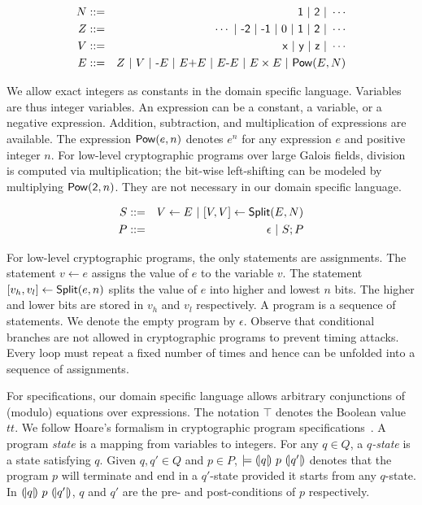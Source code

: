 \begin{eqnarray*}
  N & ::= & \dslcode{1}\ |\ \dslcode{2}\ |\ \cdots\\
  Z & ::= & \cdots \ |\ \dslcode{-2}\ |\ \dslcode{-1} \ |\ 0\ |\ 
            \dslcode{1}\ |\ \dslcode{2}\ |\ \cdots\\
  V & ::= & \dslcode{x} \ |\ \dslcode{y} \ |\ \dslcode{z} \ |\ \cdots\\
  E & ::= &  Z \ |\ V \ |\  \dslcode{-}E \ |\ E \dslcode{+} E 
             \ |\ E \dslcode{-} E
             \ |\ E \times E \ |\ \dslcode{Pow} (E, N)
\end{eqnarray*}

We allow exact integers as constants in the domain specific
language. Variables are thus integer variables. An expression can be a
constant, a variable, or a negative expression. Addition, subtraction,
and multiplication of expressions are available. The expression
$\mbox{\textsf{Pow}}(e, n)$ denotes $e^n$ for any expression $e$ and positive
integer $n$. For low-level cryptographic programs over large Galois
fields, division is computed via multiplication; the bit-wise
left-shifting can be modeled by multiplying
$\mbox{\textsf{Pow}}(\mbox{\textsf{2}}, n)$. They are not necessary in our
domain specific language. 

\begin{eqnarray*}
  S & ::= & V \leftarrow E 
            \ |\  {[}{V}, {V}{]} \leftarrow \mbox{\textsf{Split}} (E, N)\\
  P & ::= & \epsilon \ |\ S; P
\end{eqnarray*}

For low-level cryptographic programs, the only statements are
assignments. The statement $v \leftarrow e$ assigns the value of $e$
to the variable $v$. The statement ${[}{v_h}, {v_l}{]} \leftarrow
\mbox{\textsf{Split}}(e, n)$ splits the value of $e$ into higher and lowest
$n$ bits. The higher and lower bits are stored in $v_h$ and $v_l$
respectively. A program is a sequence of statements. We denote the
empty program by $\epsilon$. Observe that conditional branches are not
allowed in cryptographic programs to prevent timing attacks. Every
loop must repeat a fixed number of times and hence can be unfolded
into a sequence of assignments.

For specifications, our domain specific language allows arbitrary
conjunctions of (modulo) equations over expressions. The notation
$\top$ denotes the Boolean value $\mathit{tt}$. We follow Hoare's
formalism in cryptographic program specifications~\cite{H:69:ABCP}. A program
\textit{state} is a mapping from variables to integers. For any $q \in
Q$, a \emph{$q$-state} is a state satisfying $q$.
Given $q, q' \in Q$ and $p \in P$, $\models {(\!|}{q}{|\!)}~{p}~{(\!|}{q'}{|\!)}$
denotes that the program $p$ will terminate and end in a $q'$-state
provided it starts from any $q$-state. In ${(\!|}{q}{|\!)}~{p}~{(\!|}{q'}{|\!)}$,
$q$ and $q'$ are the pre- and post-conditions of $p$ respectively.

